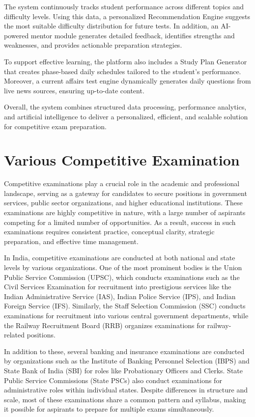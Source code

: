 \begin{sloppypar}
The system continuously tracks student performance across different topics and difficulty levels. Using this data, a personalized Recommendation Engine suggests the most suitable difficulty distribution for future tests. In addition, an AI-powered mentor module generates detailed feedback, identifies strengths and weaknesses, and provides actionable preparation strategies.

To support effective learning, the platform also includes a Study Plan Generator that creates phase-based daily schedules tailored to the student's performance. Moreover, a current affairs test engine dynamically generates daily questions from live news sources, ensuring up-to-date content.

Overall, the system combines structured data processing, performance analytics, and artificial intelligence to deliver a personalized, efficient, and scalable solution for competitive exam preparation.

\section{Various Competitive Examination}

Competitive examinations play a crucial role in the academic and professional landscape, serving as a gateway for candidates to secure positions in government services, public sector organizations, and higher educational institutions. These examinations are highly competitive in nature, with a large number of aspirants competing for a limited number of opportunities. As a result, success in such examinations requires consistent practice, conceptual clarity, strategic preparation, and effective time management.

In India, competitive examinations are conducted at both national and state levels by various organizations. One of the most prominent bodies is the Union Public Service Commission (UPSC), which conducts examinations such as the Civil Services Examination for recruitment into prestigious services like the Indian Administrative Service (IAS), Indian Police Service (IPS), and Indian Foreign Service (IFS). Similarly, the Staff Selection Commission (SSC) conducts examinations for recruitment into various central government departments, while the Railway Recruitment Board (RRB) organizes examinations for railway-related positions.

In addition to these, several banking and insurance examinations are conducted by organizations such as the Institute of Banking Personnel Selection (IBPS) and State Bank of India (SBI) for roles like Probationary Officers and Clerks. State Public Service Commissions (State PSCs) also conduct examinations for administrative roles within individual states. Despite differences in structure and scale, most of these examinations share a common pattern and syllabus, making it possible for aspirants to prepare for multiple exams simultaneously.


\end{sloppypar}
